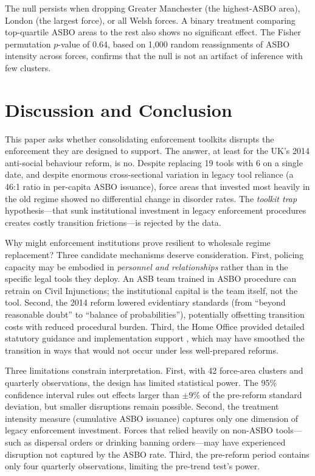 \documentclass[12pt]{article}
\begin{document}


The null persists when dropping Greater Manchester (the highest-ASBO area), London (the largest force), or all Welsh forces. A binary treatment comparing top-quartile ASBO areas to the rest also shows no significant effect. The Fisher permutation $p$-value of 0.64, based on 1,000 random reassignments of ASBO intensity across forces, confirms that the null is not an artifact of inference with few clusters.


\section{Discussion and Conclusion}

This paper asks whether consolidating enforcement toolkits disrupts the enforcement they are designed to support. The answer, at least for the UK's 2014 anti-social behaviour reform, is no. Despite replacing 19 tools with 6 on a single date, and despite enormous cross-sectional variation in legacy tool reliance (a 46:1 ratio in per-capita ASBO issuance), force areas that invested most heavily in the old regime showed no differential change in disorder rates. The \textit{toolkit trap} hypothesis---that sunk institutional investment in legacy enforcement procedures creates costly transition frictions---is rejected by the data.

Why might enforcement institutions prove resilient to wholesale regime replacement? Three candidate mechanisms deserve consideration. First, policing capacity may be embodied in \textit{personnel and relationships} rather than in the specific legal tools they deploy. An ASB team trained in ASBO procedure can retrain on Civil Injunctions; the institutional capital is the team itself, not the tool. Second, the 2014 reform lowered evidentiary standards (from ``beyond reasonable doubt'' to ``balance of probabilities''), potentially offsetting transition costs with reduced procedural burden. Third, the Home Office provided detailed statutory guidance and implementation support \citep{homeoffice2014guide}, which may have smoothed the transition in ways that would not occur under less well-prepared reforms.

Three limitations constrain interpretation. First, with 42 force-area clusters and quarterly observations, the design has limited statistical power. The 95\% confidence interval rules out effects larger than $\pm 9\%$ of the pre-reform standard deviation, but smaller disruptions remain possible. Second, the treatment intensity measure (cumulative ASBO issuance) captures only one dimension of legacy enforcement investment. Forces that relied heavily on non-ASBO tools---such as dispersal orders or drinking banning orders---may have experienced disruption not captured by the ASBO rate. Third, the pre-reform period contains only four quarterly observations, limiting the pre-trend test's power.
\end{document}

